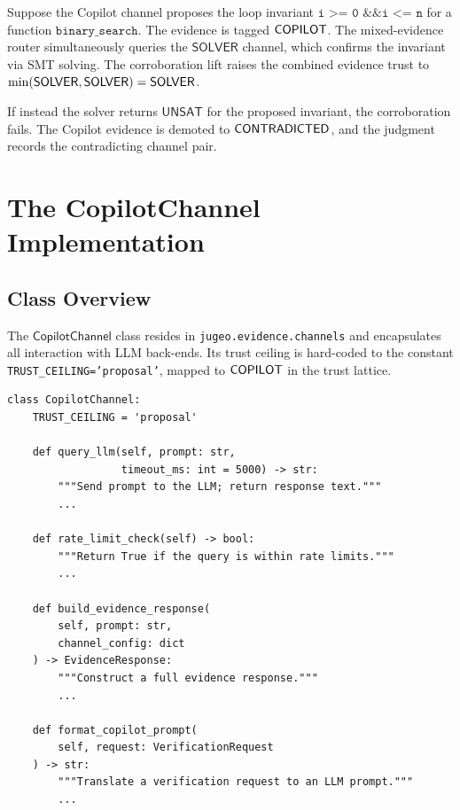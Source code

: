 \documentclass[11pt]{article}
\newcommand{\CopCh}{\mathsf{CopilotChannel}}
\begin{document}
\begin{example}
\label{ex:corrob-solver}
Suppose the Copilot channel proposes the loop invariant
$\texttt{i >= 0 \&\& i <= n}$ for a function
$\texttt{binary\_search}$.  The evidence is tagged
$\mathsf{COPILOT}$.  The mixed-evidence router simultaneously
queries the $\mathsf{SOLVER}$ channel, which confirms the
invariant via SMT solving.  The corroboration lift raises
the combined evidence trust to
$\min(\mathsf{SOLVER}, \mathsf{SOLVER}) = \mathsf{SOLVER}$.
\end{example}

\begin{example}
\label{ex:corrob-fail}
If instead the solver returns $\mathsf{UNSAT}$ for the
proposed invariant, the corroboration fails.  The Copilot
evidence is demoted to $\mathsf{CONTRADICTED}$, and the judgment records
the contradicting channel pair.
\end{example}

\section{The CopilotChannel Implementation}
\label{sec:copilot}

\subsection{Class Overview}
\label{sec:copilot:overview}

The $\CopCh$ class resides in \texttt{jugeo.evidence.channels} and
encapsulates all interaction with LLM back-ends.  Its trust ceiling
is hard-coded to the constant \texttt{TRUST\_CEILING='proposal'},
mapped to $\mathsf{COPILOT}$ in the trust lattice.

\begin{lstlisting}[style=jugeo-python,caption={The \texttt{CopilotChannel} class (simplified).},label=lst:copilotchannel]
class CopilotChannel:
    TRUST_CEILING = 'proposal'

    def query_llm(self, prompt: str,
                  timeout_ms: int = 5000) -> str:
        """Send prompt to the LLM; return response text."""
        ...

    def rate_limit_check(self) -> bool:
        """Return True if the query is within rate limits."""
        ...

    def build_evidence_response(
        self, prompt: str,
        channel_config: dict
    ) -> EvidenceResponse:
        """Construct a full evidence response."""
        ...

    def format_copilot_prompt(
        self, request: VerificationRequest
    ) -> str:
        """Translate a verification request to an LLM prompt."""
        ...
\end{lstlisting}
\end{document}
